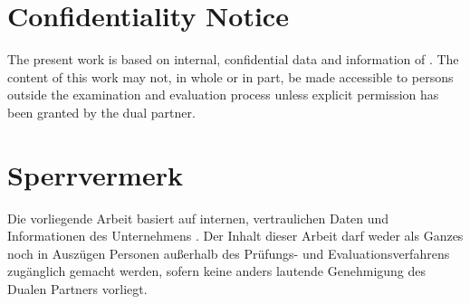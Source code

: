 
\thispagestyle{empty}

\ifenglisch
\section*{Confidentiality Notice}

\vspace*{2em}

The present work is based on internal, confidential data and information of \firma.
The content of this work may not, in whole or in part, be made accessible to persons outside the examination and evaluation process unless explicit permission has been granted by the dual partner.
\else
\section*{Sperrvermerk}

\vspace*{2em}

Die vorliegende Arbeit basiert auf internen, vertraulichen Daten und Informationen des Unternehmens \firma.
Der Inhalt dieser Arbeit darf weder als Ganzes noch in Auszügen Personen außerhalb des Prüfungs- und Evaluationsverfahrens zugänglich gemacht werden, sofern keine anders lautende Genehmigung des Dualen Partners vorliegt.
\fi
